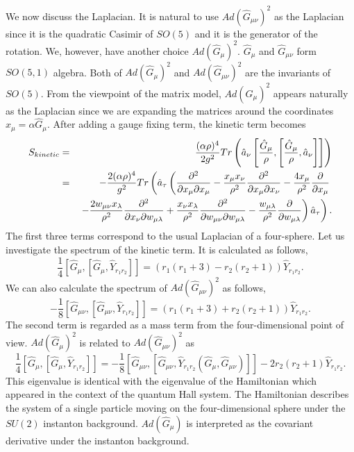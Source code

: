 \documentclass[a4paper,11pt]{article}
\begin{document}
We now discuss the Laplacian. 
It is natural to use $Ad(\hat{G}_{\mu\nu})^{2}$ as 
the Laplacian since it is the quadratic Casimir of $SO(5)$ 
and it is the generator of the rotation. 
We, however, have another choice $Ad(\hat{G}_{\mu})^{2}$. 
$\hat{G}_{\mu}$ and $\hat{G}_{\mu\nu}$ form $SO(5,1)$ algebra. 
Both of $Ad(\hat{G}_{\mu})^{2}$ and $Ad(\hat{G}_{\mu\nu})^{2}$ 
are the invariants of $SO(5)$. 
From the viewpoint of the matrix model, $Ad(\hat{G}_{\mu})^{2}$ 
appears naturally as the Laplacian since 
we are expanding the matrices around 
the coordinates $\hat{x}_{\mu}=\alpha\hat{G}_{\mu}$. 
After adding a gauge fixing term, the kinetic term becomes 
\begin{eqnarray} 
S_{kinetic}
&=&\frac{(\alpha\rho)^{4}}{2g^{2}}
Tr\left(\hat{a}_{\nu}\left[\frac{\hat{G}_{\mu}}{\rho},
\left[\frac{\hat{G}_{\mu}}{\rho},\hat{a}_{\nu}
\right]\right]\right) \cr 
&=&-\frac{2(\alpha\rho)^{4}}{g^{2}}Tr\left(\hat{a}_{\tau}
\left(
\frac{\partial^{2}}{\partial x_{\mu}\partial x_{\mu}} 
-\frac{x_{\mu}x_{\nu}}{\rho^{2}}
\frac{\partial^{2}}{\partial x_{\mu}\partial x_{\nu}} 
-\frac{4x_{\mu}}{\rho^{2}}
\frac{\partial}{\partial x_{\mu}}  \right. \right.\cr 
&&\left.\left. 
-\frac{2w_{\mu\nu}x_{\lambda}}{\rho^{2}} 
\frac{\partial^{2}}{\partial x_{\nu}\partial w_{\mu\lambda}} 
+\frac{x_{\nu}x_{\lambda}}{\rho^{2}} 
\frac{\partial^{2}}{\partial w_{\mu\nu}\partial w_{\mu\lambda}} 
-\frac{w_{\mu\lambda}}{\rho^{2}}
\frac{\partial}{\partial w_{\mu\lambda}} 
\right)\hat{a}_{\tau}\right). 
\label{kinetic}
\end{eqnarray} 
The first three terms correspond to the usual 
Laplacian of a four-sphere.
Let us investigate the spectrum of the kinetic term. 
It is calculated as follows, 
\begin{equation}
\frac{1}{4}[\hat{G}_{\mu},[\hat{G}_{\mu},
\hat{Y}_{r_{1}r_{2}}]]
=\left(r_{1}(r_{1}+3)-r_{2}(r_{2}+1)\right)
\hat{Y}_{r_{1}r_{2}}. 
\end{equation}
We can also calculate the spectrum of 
$Ad(\hat{G}_{\mu\nu})^{2}$ as follows, 
\begin{equation}
-\frac{1}{8}
[\hat{G}_{\mu\nu},[\hat{G}_{\mu\nu},
\hat{Y}_{r_{1}r_{2}}]]
=\left(r_{1}(r_{1}+3)+r_{2}(r_{2}+1)\right)
\hat{Y}_{r_{1}r_{2}}.
\end{equation}
The second term is regarded as a mass term from 
the four-dimensional point of view.
$Ad(\hat{G}_{\mu})^{2}$ is related to 
$Ad(\hat{G}_{\mu\nu})^{2}$ as 
\begin{equation}
\frac{1}{4}[\hat{G}_{\mu},[\hat{G}_{\mu},
\hat{Y}_{r_{1}r_{2}}]]
=-\frac{1}{8}
[\hat{G}_{\mu\nu},[\hat{G}_{\mu\nu},
\hat{Y}_{r_{1}r_{2}}(\hat{G}_{\mu},\hat{G}_{\mu\nu})]]
-2r_{2}(r_{2}+1)\hat{Y}_{r_{1}r_{2}}. 
\end{equation}
This eigenvalue is identical with the eigenvalue 
of the Hamiltonian which appeared in the context of 
the quantum Hall system\cite{zhanghu}. 
The Hamiltonian describes the system of 
a single particle moving on the four-dimensional sphere 
under the $SU(2)$ 
instanton background. 
$Ad(\hat{G}_{\mu})$ is interpreted as the covariant derivative 
under the instanton background. 
\end{document}
